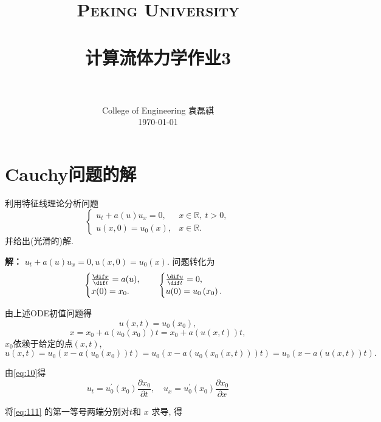 \documentclass[12pt]{article}
\title{
		\vspace{-1in} 	
		\usefont{OT1}{bch}{b}{n}
		\normalfont \normalsize \textsc{\LARGE Peking University}\\[0.2cm] %
		\horrule{0.5pt} \\[0.2cm]
		\huge \bfseries{计算流体力学作业3} \\[-0.2cm]
		\horrule{2pt} \\[0.2cm]
}
\author{
		\normalfont 								\normalsize
		College of Engineering \quad 2001111690  \quad 袁磊祺\\	\normalsize
        \today
}
\date{}
\begin{document}


\maketitle

\section{Cauchy问题的解}

利用特征线理论分析问题
\begin{equation}
	\begin{cases}
		u_{t}+a(u) u_{x}=0, & x \in \mathbb{R},\ t>0, \\
		u(x, 0)=u_{0}(x), & x \in \mathbb{R}.
	\end{cases}
	\label{eq:10}
\end{equation}
并给出(光滑的)解.

{\bfseries 解：}
$u_{t}+a(u) u_{x}=0, u(x, 0)=u_{0}(x) .$ 问题转化为
\begin{equation}
	\begin{cases}
		\frac{\dif x}{\dif t}=a(u), \\
		x(0)=x_{0}.
	\end{cases}
	\quad
	\begin{cases}
		\frac{\dif u}{\dif t}=0, \\
		u(0)=u_{0}\left(x_{0}\right).		
	\end{cases}
\end{equation}

由上述ODE初值问题得
\begin{equation}
	u(x,t) = u_0(x_0),
	\label{eq:11}
\end{equation}
\begin{equation}
	x=x_{0}+a(u_0(x_0))t=x_{0}+a(u(x,t))t,
	\label{eq:111}
\end{equation}
$x_0$依赖于给定的点$(x,t)$,
\begin{equation}
	u(x, t)=u_{0}\left(x-a(u_0(x_0))t\right)=u_{0}\left(x-a(u_0(x_0(x,t)))t\right)=u_{0}\left(x-a(u(x,t))t\right).
	\label{eq:12}
\end{equation}

由\cref{eq:10}得
\begin{equation}
	u_{t}=u_{0}^{\prime}\left(x_{0}\right) \frac{\partial x_{0}}{\partial t}, \quad u_{x}=u_{0}^{\prime}\left(x_{0}\right) \frac{\partial x_{0}}{\partial x}
	\label{eq:121}
\end{equation}

将\cref{eq:111} 的第一等号两端分别对$t$和 $x$ 求导, 得
\end{document}
